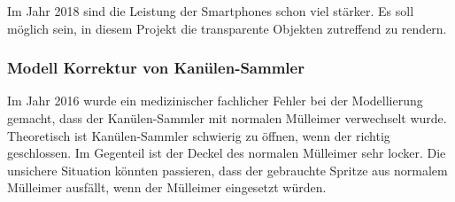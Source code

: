    Im Jahr 2018 sind die Leistung der Smartphones schon viel stärker. Es soll möglich sein, in diesem Projekt die transparente Objekten zutreffend zu rendern.
   
   \subsubsection{Modell Korrektur von Kanülen-Sammler}
   Im Jahr 2016 wurde ein medizinischer fachlicher Fehler bei der Modellierung gemacht, dass der Kanülen-Sammler mit normalen Mülleimer verwechselt wurde. Theoretisch ist Kanülen-Sammler schwierig zu öffnen, wenn der richtig geschlossen. Im Gegenteil ist der Deckel des normalen Mülleimer sehr locker. Die unsichere Situation könnten  passieren, dass der gebrauchte Spritze aus normalem Mülleimer ausfällt, wenn der Mülleimer eingesetzt würden.
   
